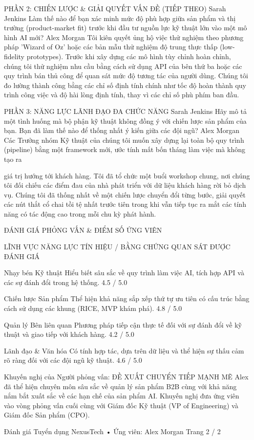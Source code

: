 \documentclass[12pt]{article}
\begin{document}
PHẦN 2: CHIẾN LƯỢC \& GIẢI QUYẾT VẤN ĐỀ (TIẾP THEO)
Sarah Jenkins
Làm thế nào để bạn xác minh mức độ phù hợp giữa sản phẩm và thị trường (product-market fit) trước khi đầu tư nguồn lực kỹ thuật lớn vào một mô hình AI mới?
Alex Morgan
Tôi kiên quyết ủng hộ việc thử nghiệm theo phương pháp 'Wizard of Oz' hoặc các bản mẫu thử nghiệm độ trung thực thấp (low-fidelity prototypes). Trước khi xây dựng các mô hình tùy chỉnh hoàn chỉnh, chúng tôi thử nghiệm nhu cầu bằng cách sử dụng API của bên thứ ba hoặc các quy trình bán thủ công để quan sát mức độ tương tác của người dùng. Chúng tôi đo lường thành công bằng các chỉ số định tính chính như tốc độ hoàn thành quy trình công việc và độ hài lòng định tính, thay vì các chỉ số phù phím ban đầu.

PHẦN 3: NĂNG LỰC LÃNH ĐẠO ĐA CHỨC NĂNG
Sarah Jenkins
Hãy mô tả một tình huống mà bộ phận kỹ thuật không đồng ý với chiến lược sản phẩm của bạn. Bạn đã làm thế nào để thống nhất ý kiến giữa các đội ngũ?
Alex Morgan
Các Trưởng nhóm Kỹ thuật của chúng tôi muốn xây dựng lại toàn bộ quy trình (pipeline) bằng một framework mới, ước tính mất bốn tháng làm việc mà không tạo ra

giá trị hướng tới khách hàng. Tôi đã tổ chức một buổi workshop chung, nơi chúng tôi đối chiếu các điểm đau của nhà phát triển với dữ liệu khách hàng rời bỏ dịch vụ. Chúng tôi đã thống nhất về một chiến lược chuyển đổi từng bước, giải quyết các nút thắt cổ chai tồi tệ nhất trước tiên trong khi vẫn tiếp tục ra mắt các tính năng có tác động cao trong mỗi chu kỳ phát hành.

ĐÁNH GIÁ PHỎNG VẤN \& ĐIỂM SỐ ỨNG VIÊN

LĨNH VỰC NĂNG LỰC
TÍN HIỆU / BẰNG CHỨNG QUAN SÁT ĐƯỢC
ĐÁNH GIÁ

Nhạy bén Kỹ thuật
Hiểu biết sâu sắc về quy trình làm việc AI, tích hợp API và các sự đánh đổi trong hệ thống.
4.5 / 5.0

Chiến lược Sản phẩm
Thể hiện khả năng sắp xếp thứ tự ưu tiên có cấu trúc bằng cách sử dụng các khung (RICE, MVP khám phá).
4.8 / 5.0

Quản lý Bên liên quan
Phương pháp tiếp cận thực tế đối với sự đánh đổi về kỹ thuật và giao tiếp với khách hàng.
4.2 / 5.0

Lãnh đạo \& Văn hóa
Có tính hợp tác, dựa trên dữ liệu và thể hiện sự thấu cảm rõ ràng đối với các đội ngũ kỹ thuật.
4.6 / 5.0

Khuyến nghị của Người phỏng vấn: ĐỀ XUẤT CHUYỂN TIẾP MẠNH MẼ
Alex đã thể hiện chuyên môn sâu sắc về quản lý sản phẩm B2B cùng với khả năng nắm bắt xuất sắc về các hạn chế của sản phẩm AI. Khuyến nghị đưa ứng viên vào vòng phỏng vấn cuối cùng với Giám đốc Kỹ thuật (VP of Engineering) và Giám đốc Sản phẩm (CPO).

Đánh giá Tuyển dụng NexusTech • Ứng viên: Alex Morgan
Trang 2 / 2
\end{document}
